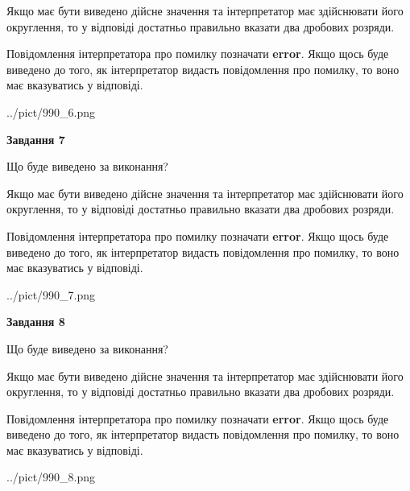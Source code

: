 \documentclass[12pt, ukrainian]{article}
\begin{document}
{\begin {Large}
Якщо має бути виведено дійсне значення та інтерпретатор має здійснювати його округлення, 
то у відповіді достатньо правильно вказати два дробових розряди.

Повідомлення інтерпретатора про помилку позначати \textbf{error}.
Якщо щось буде виведено до того, як інтерпретатор видасть повідомлення про помилку, 
то воно має вказуватись у відповіді. \par

\begin{center}
	{../pict/990_6.png}
\end{center}
\newpage

{\begin {center}\textbf{Завдання 7}\end {center}}\par
Що буде виведено за виконання? \par

Якщо має бути виведено дійсне значення та інтерпретатор має здійснювати його округлення, 
то у відповіді достатньо правильно вказати два дробових розряди.

Повідомлення інтерпретатора про помилку позначати \textbf{error}.
Якщо щось буде виведено до того, як інтерпретатор видасть повідомлення про помилку, 
то воно має вказуватись у відповіді. \par

\begin{center}
	{../pict/990_7.png}
\end{center}
\newpage

{\begin {center}\textbf{Завдання 8}\end {center}}\par
Що буде виведено за виконання? \par

Якщо має бути виведено дійсне значення та інтерпретатор має здійснювати його округлення, 
то у відповіді достатньо правильно вказати два дробових розряди.

Повідомлення інтерпретатора про помилку позначати \textbf{error}.
Якщо щось буде виведено до того, як інтерпретатор видасть повідомлення про помилку, 
то воно має вказуватись у відповіді. \par

\begin{center}
	{../pict/990_8.png}
\end{center}
\newpage


\end{Large}}
\end{document}
